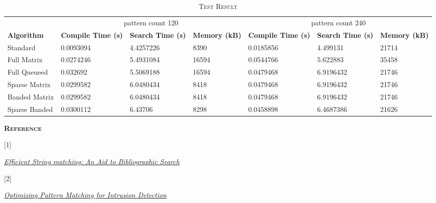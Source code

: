 \documentclass[a4paper]{article}
\begin{document}
\begin{table}[h]
\caption{\textsc{Test Result}}
\begin{tabular}{ |l|p{2cm}|p{2cm}|p{2cm}|p{2cm}|p{2cm}|p{2cm}| }
\hline\hline
& \multicolumn{3}{|c|}{pattern count 120}  &
  \multicolumn{3}{|c|}{pattern count 240} \\
\cline{2-7}
\textbf{Algorithm} & \textbf{Compile Time (s)}  & \textbf{Search Time (s)} & \textbf{Memory (kB)} & \textbf{Compile Time (s)} & \textbf{Search Time (s)} & \textbf{Memory (kB)} \\
\hline\hline
Standard      & 0.0093094 & 4.4257226 & 8390 & 0.0185856 & 4.499131 & 21714\\
Full Matrix   & 0.0274246 & 5.4931084 & 16594 & 0.0544766 & 5.622883 & 35458\\
Full Queueed  & 0.032692  & 5.5069188 & 16594 & 0.0479468 & 6.9196432 & 21746\\
Sparse Matrix & 0.0299582 & 6.0480434 & 8418 & 0.0479468 & 6.9196432 & 21746\\
Banded Matrix & 0.0299582 & 6.0480434 & 8418 & 0.0479468 & 6.9196432 & 21746\\
Sparse Banded & 0.0300112 & 6.43706 & 8298 & 0.0458898 & 6.4687386 & 21626\\
\hline
\end{tabular}
\end{table}


\textsc{\textbf{Reference}}

\hypertarget{effic}{[1]} \href{http://cr.yp.to/bib/1975/aho.pdf}{\textit{Efficient String matching: An Aid to Bibliographic Search}}

\hypertarget{snort}{[2]} \href{http://citeseerx.ist.psu.edu/viewdoc/download?doi=10.1.1.103.4663&rep=rep1&type=pdf}{\textit{Optimizing Pattern Matching for Intrusion Detection}}
\end{document}
